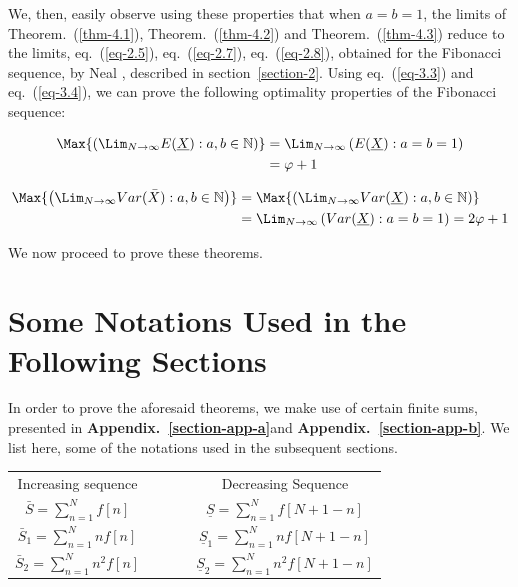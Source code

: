 \begin{multicols}{2}
We, then, easily observe using these properties that when $a = b = 1$, the limits of Theorem.~(\ref{thm-4.1}), Theorem.~(\ref{thm-4.2}) and Theorem.~(\ref{thm-4.3}) reduce to the limits, eq.~(\ref{eq-2.5}), eq.~(\ref{eq-2.7}), eq.~(\ref{eq-2.8}), obtained for the Fibonacci sequence, by Neal \cite{art1-key01}, described in section~\ref{section-2}. Using eq.~(\ref{eq-3.3}) and eq.~(\ref{eq-3.4}), we can prove the following optimality properties of the Fibonacci sequence:
\begin{thm}
 \label{thm-4.5}
\begin{align*}
\Max{\left(\Lim_{N\rightarrow \infty} E(\underline{X}): a, b \in \mathbb N \right)} &= \Lim_{N \rightarrow \infty}\left(E(\underline{X}):a=b=1\right)\\
 &= \varphi + 1
\end{align*}
\end{thm}
\begin{thm}
\label{thm-4.6}
{\fontsize{7.3}{8.3}\selectfont\begin{align*}
\Max{\left (\Lim_{N\rightarrow \infty}Var(\bar{X}): a,b \in \mathbb N\right)} &=\Max{\left(\Lim_{N\rightarrow \infty}Var(\underline{X}): a,b \in \mathbb N\right)}\\
&= \Lim_{N \rightarrow \infty}\left(Var(\underline{X}):a=b=1\right)= 2\varphi + 1
\end{align*}}
 \end{thm}

\vspace{-.5cm}

We now proceed to prove these theorems.

\vspace{-.5cm}

\section{Some Notations Used in the\\ Following Sections}\label{section-5}
In order to prove the aforesaid theorems, we make use of certain finite sums, presented in \textbf{Appendix.~\ref{section-app-a}}\break and \textbf{Appendix.~\ref{section-app-b}}. We list here, some of the notations used in the subsequent sections.

\begin{tabular}{cccc}
  Increasing sequence & ~ &~& Decreasing Sequence\\[.2cm]
 $\bar{S} = \displaystyle{\sum_{n=1}^{N}}f[n]$& ~ &~& $\underline{S} = \displaystyle{\sum_{n=1}^{N}}f[N+1-n]$ \\
 $\bar{S}_1 = \displaystyle{\sum_{n=1}^{N}}n f[n]$ & ~ &~& $\underline{S}_1 = \displaystyle{\sum_{n=1}^{N}}n f[N+1-n]$ \\
 $\bar{S}_2 = \displaystyle{\sum_{n=1}^{N}}n^2 f[n]$ &~& ~&$\underline{S}_2 = \displaystyle{\sum_{n=1}^{N}}n^2 f[N+1-n]$ 
\end{tabular}


\end{multicols}
